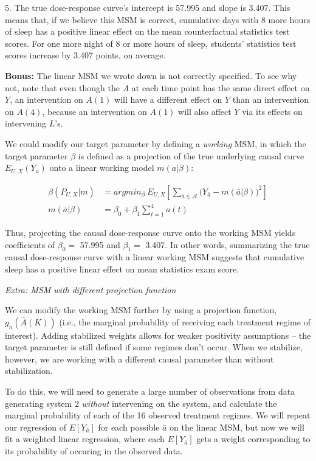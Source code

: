 \documentclass[answers]{exam}
\begin{document}
\begin{solution}
5. The true dose-response curve's intercept is 57.995 and slope is 3.407. This means that, if we believe this MSM is correct, cumulative days with 8 more hours of sleep has a positive linear effect on the mean counterfactual statistics test scores. For one more night of 8 or more hours of sleep, students' statistics test scores increase by 3.407 points, on average.

\vspace{2mm}

\textbf{Bonus:} The linear MSM we wrote down is not correctly specified. To see why not, note that even though the $A$ at each time point has the same direct effect on $Y$, an intervention on $A(1)$ will have a different effect on $Y$ than an intervention on $A(4)$, because an intervention on $A(1)$ will also affect $Y$ via its effects on intervening $L$'s.

We could modify our target parameter by defining a \textit{working} MSM, in which the target parameter $\beta$ is defined as a projection of the true underlying causal curve $E_{U,X}(Y_a)$ onto a linear working model $m(a|\beta)$:

\begin{align*}
\beta(P_{U,X} | m) &= argmin_{\beta} \ E_{U,X}\left[ \sum_{\bar{a}\in \mathcal{A}} \big(Y_{\bar{a}} - m(\bar{a} | \beta)\big)^2 \right] \\
m(\bar{a} |\beta) &= \beta_0 + \beta_1 \sum_{t=1}^4 a(t)
\end{align*}

Thus, projecting the causal dose-response curve onto the working MSM yields coefficients of $\beta_0 = $ 57.995 and $\beta_1= $ 3.407. In other words, summarizing the true causal dose-response curve with a linear working MSM suggests that cumulative sleep has a positive linear effect on mean statistics exam score.

\noindent \textit{Extra: MSM with different projection function}

We can modify the working MSM further by using a projection function, $g_n(\bar{A}(K))$ (i.e., the marginal probability of receiving each treatment regime of interest). Adding stabilized weights allows for weaker positivity assumptions -- the target parameter is still defined if some regimes don't occur. When we stabilize, however, we are working with a different causal parameter than without stabilization.

To do this, we will need to generate a large number of observations from data generating system 2 \textit{without} intervening on the system, and calculate the marginal probability of each of the 16 observed treatment regimes. We will repeat our regression of $E[Y_{\bar{a}}]$ for each possible $\bar{a}$ on the linear MSM, but now we will fit a weighted linear regression, where each $E[Y_{\bar{a}}]$ gets a weight corresponding to its probability of occuring in the observed data.



\end{solution}
\end{document}

